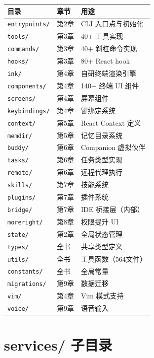 {\small
\begin{longtable}{llp{6.5cm}}
\toprule
\textbf{目录} & \textbf{章节} & \textbf{用途} \\
\midrule
\endhead
\texttt{entrypoints/} & 第2章 & CLI 入口点与初始化 \\
\texttt{tools/} & 第3章 & 40+ 工具实现 \\
\texttt{commands/} & 第3章 & 40+ 斜杠命令实现 \\
\texttt{hooks/} & 第3章 & 80+ React hook \\
\texttt{ink/} & 第4章 & 自研终端渲染引擎 \\
\texttt{components/} & 第4章 & 140+ 终端 UI 组件 \\
\texttt{screens/} & 第4章 & 屏幕组件 \\
\texttt{keybindings/} & 第4章 & 键绑定系统 \\
\texttt{context/} & 第5章 & React Context 定义 \\
\texttt{memdir/} & 第5章 & 记忆目录系统 \\
\texttt{buddy/} & 第6章 & Companion 虚拟伙伴 \\
\texttt{tasks/} & 第6章 & 任务类型实现 \\
\texttt{remote/} & 第6章 & 远程代理执行 \\
\texttt{skills/} & 第7章 & 技能系统 \\
\texttt{plugins/} & 第7章 & 插件系统 \\
\texttt{bridge/} & 第7章 & IDE 桥接层（内部） \\
\texttt{moreright/} & 第8章 & 权限提升 UI \\
\texttt{state/} & 第2章 & 全局状态管理 \\
\texttt{types/} & 全书 & 共享类型定义 \\
\texttt{utils/} & 全书 & 工具函数（564文件） \\
\texttt{constants/} & 全书 & 全局常量 \\
\texttt{migrations/} & 第9章 & 数据迁移 \\
\texttt{vim/} & 第4章 & Vim 模式支持 \\
\texttt{voice/} & 第9章 & 语音输入 \\
\bottomrule
\end{longtable}
}

\section*{services/ 子目录}

